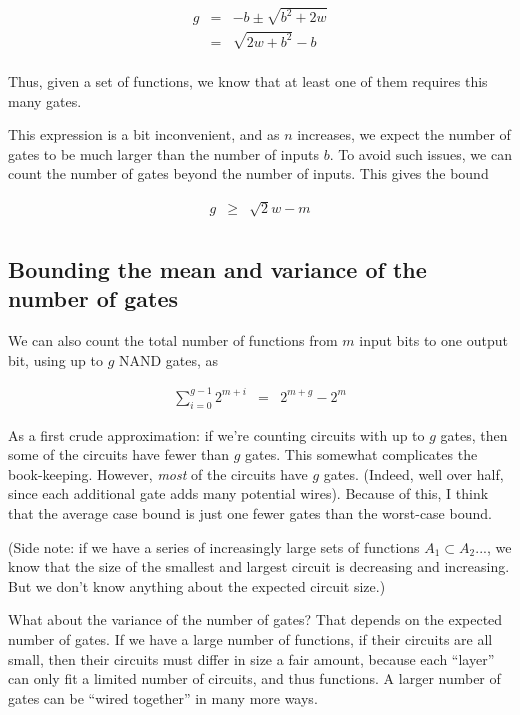 \documentclass[12pt]{article}
\theoremstyle{definition}
\begin{document}
\begin{eqnarray*}
g & = & -b \pm \sqrt{ b^2 + 2w} \\
  & = & {\sqrt {2w + b^2}} - b \\
\end{eqnarray*}

Thus, given a set of functions, we know that at least one of them requires
this many gates.

This expression is a bit inconvenient, and as $n$ increases, we
expect the number of gates to be much larger than the number of
inputs $b$. To avoid such issues, we can count the number of gates
beyond the number of inputs. This gives the bound

\begin{eqnarray*}
g & \ge & {\sqrt 2w} - m \\
\end{eqnarray*}


\subsection{Bounding the mean and variance of the number of gates}

We can also count the total number of functions from $m$ input bits to one
output bit, using up to $g$ NAND gates, as

\begin{eqnarray*}
\sum_{i=0}^{g-1} 2^{m+i} & = & 2^{m+g} - 2^m
\end{eqnarray*}

As a first crude approximation:
if we're counting circuits with up to $g$ gates, then some of the circuits
have fewer than $g$ gates. This somewhat complicates the book-keeping.
However, {\em most} of the
circuits have $g$ gates. (Indeed, well over half, since each additional
gate adds many potential wires). Because of this, I think that the
average case bound is just one fewer gates than the worst-case bound.

(Side note: if we have a series of increasingly large
sets of functions
$A_1 \subset A_2 ...$, we know that the size of the smallest and
largest circuit is decreasing and increasing. But we don't know
anything about the expected circuit size.)

What about the variance of the number of gates? That depends on the
expected number of gates. If we have a large number of functions,
if their circuits are all small, then their circuits must differ in
size a fair amount, because each ``layer'' can only fit a limited
number of circuits, and thus functions. A larger number of gates
can be ``wired together'' in many more ways.
\end{document}

